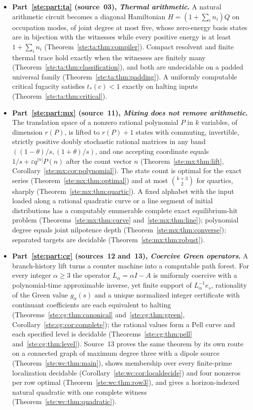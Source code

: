 \documentclass[11pt,letterpaper]{article}
\theoremstyle{definition}
\theoremstyle{remark}
\begin{document}
\begin{itemize}
\item \textbf{Part~\ref{ste:part:ta} (source~03), \emph{Thermal arithmetic}.} A natural arithmetic circuit becomes a diagonal Hamiltonian $H=(1+\sum_in_i)Q$ on occupation modes, of joint degree at most five, whose zero-energy basis states are in bijection with the witnesses while every positive energy is at least $1+\sum_in_i$ (Theorem~\ref{ste:ta:thm:compiler}). Compact resolvent and finite thermal trace hold exactly when the witnesses are finitely many (Theorem~\ref{ste:ta:thm:classification}), and both are undecidable on a padded universal family (Theorem~\ref{ste:ta:thm:padding}). A uniformly computable critical fugacity satisfies $t_*(c)<1$ exactly on halting inputs (Theorem~\ref{ste:ta:thm:critical}).
\item \textbf{Part~\ref{ste:part:mx} (source~11), \emph{Mixing does not remove arithmetic}.} The translation space of a nonzero rational polynomial $P$ in $k$ variables, of dimension $r(P)$, is lifted to $r(P)+1$ states with commuting, invertible, strictly positive doubly stochastic rational matrices in any band $((1-\theta)/s,(1+\theta)/s)$, and one accepting coordinate equals $1/s+\varepsilon q^{|n|}P(n)$ after the count vector $n$ (Theorem~\ref{ste:mx:thm:lift}, Corollary~\ref{ste:mx:cor:polynomial}). The state count is optimal for the exact series (Theorem~\ref{ste:mx:thm:optimal}) and at most $\binom{k+3}{2}$ for quartics, sharply (Theorem~\ref{ste:mx:thm:quartic}). A fixed alphabet with the input loaded along a rational quadratic curve or a line segment of initial distributions has a computably enumerable complete exact equilibrium-hit problem (Theorems~\ref{ste:mx:thm:curve} and~\ref{ste:mx:thm:line}); polynomial degree equals joint nilpotence depth (Theorem~\ref{ste:mx:thm:converse}); separated targets are decidable (Theorem~\ref{ste:mx:thm:robust}).
\item \textbf{Part~\ref{ste:part:cg} (sources~12 and~13), \emph{Coercive Green operators}.} A branch-history lift turns a counter machine into a computable path forest. For every integer $\alpha\geq3$ the operator $L_\alpha=\alpha I-A$ is uniformly coercive with a polynomial-time approximable inverse, yet finite support of $L_\alpha^{-1}e_s$, rationality of the Green value $g_\alpha(s)$ and a unique normalized integer certificate with continuant coefficients are each equivalent to halting (Theorems~\ref{ste:cg:thm:canonical} and~\ref{ste:cg:thm:green}, Corollary~\ref{ste:cg:cor:complete}); the rational values form a Pell curve and each specified level is decidable (Theorems~\ref{ste:cg:thm:pell} and~\ref{ste:cg:thm:level}). Source~13 proves the same theorem by its own route on a connected graph of maximum degree three with a dipole source (Theorem~\ref{ste:wc:thm:main}), shows membership over every finite-prime localization decidable (Corollary~\ref{ste:wc:cor:localdecide}) and four nonzeros per row optimal (Theorem~\ref{ste:wc:thm:row3}), and gives a horizon-indexed natural quadratic with one complete witness (Theorem~\ref{ste:wc:thm:quadratic}).
\end{itemize}
\end{document}
